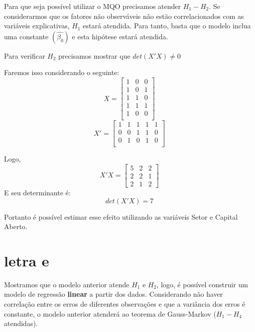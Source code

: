 Para que seja possível utilizar o MQO precisamos atender \(H_{1}-H_{2}\). Se considerarmos que os fatores não observáveis não estão correlacionados com as variáveis explicativas, \(H_{1}\) estará atendida. Para tanto, basta que o modelo inclua uma constante \((\hat{\beta_{0}})\) e esta hipótese estará atendida.

Para verificar \(H_{2}\) precisamos mostrar que \(det(X'X) \neq 0\)

Faremos isso considerando o seguinte:
\[ X =
	\begin{bmatrix}
		1 & 0 & 0 \\
		1 & 0 & 1 \\
		1 & 1 & 0 \\
		1 & 1 & 1 \\
		1 & 0 & 0 \\
	\end{bmatrix}
\]
\[ X' =
	\begin{bmatrix}
		1 & 1 & 1 & 1 & 1 \\
		0 & 0 & 1 & 1 & 0 \\
		0 & 1 & 0 & 1 & 0 \\
	\end{bmatrix}
\]

Logo,
\[ X'X =
	\begin{bmatrix}
		5 & 2 & 2 \\
		2 & 2 & 1 \\
		2 & 1 & 2
	\end{bmatrix}
\]
E seu determinante é:
\[ det(X'X) = 7\]

Portanto é possível estimar esse efeito utilizando as variáveis Setor e Capital Aberto.

\section*{letra e}
Mostramos que o modelo anterior atende \(H_{1}\) e \(H_{2}\), logo, é possível construir um modelo de regressão \textbf{linear} a partir dos dados. Considerando não haver correlação entre os erros de diferentes observações e que a variância dos erros é constante, o modelo anterior atenderá ao teorema de Gauss-Markov (\(H_{1}-H_{4}\) atendidas).
